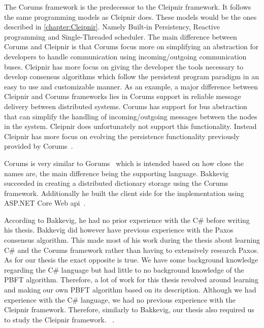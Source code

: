 The Corums framework is the predecessor to the Cleipnir framework. It follows the same programming models as Cleipnir does. These models would be the ones described in \autoref{chapter:Cleipnir}. Namely Built-in Persistency, Reactive programming and Single-Threaded scheduler.
The main difference between Corums and Cleipnir is that Corums focus more on simplifying an abstraction for developers to handle communication using incoming/outgoing communication buses. Cleipnir has more focus on giving the developer the tools necessary to develop consensus algorithms which follow the persistent program paradigm in an easy to use and customizable manner. As an example, a major difference between Cleipnir and Corums frameworks lies in Corums support in reliable message delivery between distributed systems. Corums has support for bus abstraction that can simplify the handling of incoming/outgoing messages between the nodes in the system. Cleipnir does unfortunately not support this functionality. Instead Cleipnir has more focus on evolving the persistence functionality previously provided by Corums~\cites[p.~6-7]{PAPER:PaxosCleipnir}{DOC:Cleipnir}.
 
Corums is very similar to Gorums~\cites[p.~2]{WEB:Gorums}[p.~22]{PAPER:EivindPaper} which is intended based on how close the names are, the main difference being the supporting language.
Bakkevig succeeded in creating a distributed dictionary storage using the Corums framework. Additionally he built the client side for the implementation using ASP.NET Core Web \ac{api}~\cite{WEB:ASPNetCoreAPI}.
 
According to Bakkevig, he had no prior experience with the C\# before writing his thesis. Bakkevig did however have previous experience with the Paxos consensus algorithm. This made most of his work during the thesis about learning C\# and the Corums framework rather than having to extensively research Paxos. As for our thesis the exact opposite is true. We have some background knowledge regarding the C\# language but had little to no background knowledge of the PBFT algorithm. Therefore, a lot of work for this thesis revolved around learning and making our own PBFT algorithm based on its description. Although we had experience with the C\# language, we had no previous experience with the Cleipnir framework. Therefore, similarly to Bakkevig, our thesis also required us to study the Cleipnir framework. ~\cite[p.~8]{PAPER:EivindPaper}.

